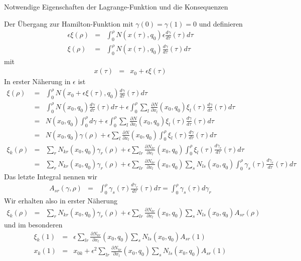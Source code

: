 \begin{chapter}{\titlestr}
\begin{appendix}
\begin{section}{Notwendige Eigenschaften der Lagrange-Funktion und die Konsequenzen}
\begin{subsection}{Der Übergang zur Hamilton-Funktion}
mit $\gamma(0)=\gamma(1)=0$ und definieren
\begin{eqnarray*}
\epsilon\xi(\rho) &=& \int_0^\rho N(x(\tau),q_0)\epsilon\frac{d\gamma}{d\tau}(\tau)d\tau\\
\xi(\rho) &=& \int_0^\rho N(x(\tau),q_0)\frac{d\gamma}{d\tau}(\tau)d\tau
\end{eqnarray*}
mit
\begin{eqnarray*}
x(\tau) &=& x_0+\epsilon \xi(\tau)
\end{eqnarray*}
In erster Näherung in $\epsilon$ ist
\begin{eqnarray*}
\xi(\rho) &=& \int_0^\rho N(x_0+\epsilon \xi(\tau),q_0)\frac{d\gamma}{d\tau}(\tau)d\tau\\
&=& \int_0^\rho N(x_0,q_0)\frac{d\gamma}{d\tau}(\tau)d\tau+\epsilon\int_0^\rho \sum_l\frac{\partial N}{\partial x_l}(x_0,q_0)\xi_l(\tau)\frac{d\gamma}{d\tau}(\tau)d\tau\\
&=& N(x_0,q_0)\int_0^\rho d\gamma +\epsilon\int_0^\rho \sum_l\frac{\partial N}{\partial x_l}(x_0,q_0)\xi_l(\tau)\frac{d\gamma}{d\tau}(\tau)d\tau\\
&=& N(x_0,q_0)\gamma(\rho) +\epsilon\sum_l\frac{\partial N}{\partial x_l}(x_0,q_0)\int_0^\rho \xi_l(\tau)\frac{d\gamma}{d\tau}(\tau)d\tau\\
\xi_k(\rho) &=&  \sum_r N_{kr}(x_0,q_0)\gamma_r(\rho) +\epsilon\sum_{lr}\frac{\partial N_{kr}}{\partial x_l}(x_0,q_0)\int_0^\rho \xi_l(\tau)\frac{d\gamma_r}{d\tau}(\tau)d\tau\\
&=&\sum_r N_{kr}(x_0,q_0)\gamma_r(\rho) +\epsilon\sum_{lr}\frac{\partial N_{kr}}{\partial x_l}(x_0,q_0)\sum_s N_{ls}(x_0,q_0)\int_0^\rho \gamma_s(\tau)\frac{d\gamma_r}{d\tau}(\tau)d\tau
\end{eqnarray*}
Das letzte Integral nennen wir
\begin{eqnarray*}
A_{sr}(\gamma,\rho) &=& \int_0^\rho \gamma_s(\tau)\frac{d\gamma_r}{d\tau}(\tau)d\tau=\int_0^\rho \gamma_s(\tau)d\gamma_r
\end{eqnarray*}
Wir erhalten also in erster Näherung
\begin{eqnarray*}
\xi_k(\rho) &=&\sum_r N_{kr}(x_0,q_0)\gamma_r(\rho) +\epsilon\sum_{lr}\frac{\partial N_{kr}}{\partial x_l}(x_0,q_0)\sum_s N_{ls}(x_0,q_0)A_{sr}(\rho)
\end{eqnarray*}
und im besonderen
\begin{eqnarray*}
\xi_k(1) &=& \epsilon\sum_{lr}\frac{\partial N_{kr}}{\partial x_l}(x_0,q_0)\sum_s N_{ls}(x_0,q_0)A_{sr}(1)\\
x_k(1) &=& x_{0k}+\epsilon^2\sum_{lr}\frac{\partial N_{kr}}{\partial x_l}(x_0,q_0)\sum_s N_{ls}(x_0,q_0)A_{sr}(1)

\end{eqnarray*}
\end{subsection}
\end{section}
\end{appendix}
\end{chapter}
